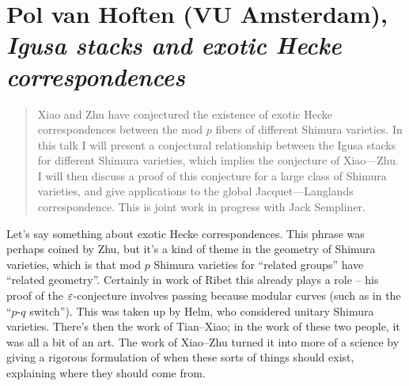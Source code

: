 \documentclass[reqno]{amsart} 
\begin{document}
\part{Pol van Hoften (VU Amsterdam), \emph{Igusa stacks and exotic Hecke correspondences}}

\begin{abstract}
  Xiao and Zhu have conjectured the existence of exotic Hecke correspondences between the mod $p$ fibers of different Shimura varieties. In this talk I will present a conjectural relationship between the Igusa stacks for different Shimura varieties, which implies the conjecture of Xiao—Zhu. I will then discuss a proof of this conjecture for a large class of Shimura varieties, and give applications to the global Jacquet—Langlands correspondence. This is joint work in progress with Jack Sempliner.
\end{abstract}

Let's say something about exotic Hecke correspondences.  This phrase was perhaps coined by Zhu, but it's a kind of theme in the geometry of Shimura varieties, which is that mod $p$ Shimura varieties for ``related groups'' have ``related geometry''.  Certainly in work of Ribet this already plays a role -- his proof of the $\varepsilon$-conjecture involves passing because modular curves (such as in the ``$p$-$q$ switch'').  This was taken up by Helm, who considered unitary Shimura varieties.  There's then the work of Tian--Xiao; in the work of these two people, it was all a bit of an art.  The work of Xiao--Zhu turned it into more of a science by giving a rigorous formulation of when these sorts of things should exist, explaining where they should come from.
\end{document}
